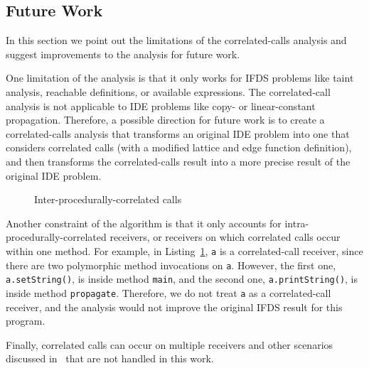 \begin{odelete}
\subsection{Future Work}
In this section we point out the limitations of the correlated-calls analysis and suggest improvements to the analysis for future work. 

One limitation of the analysis is that it only works for IFDS problems like taint analysis, reachable definitions, or available expressions. The correlated-call analysis is not applicable to IDE problems like copy- or linear-constant propagation. Therefore, a possible direction for future work is to create a correlated-calls analysis that transforms an original IDE problem into one that considers correlated calls (with a modified lattice and edge function definition), and then transforms the correlated-calls result into a more precise result of the original IDE problem.

\begin{figure}
  \centering
  \begin{minipage}{\textwidth}
  \end{minipage}
  \caption{Inter-procedurally-correlated calls}
  \label{list:interProcRec}
\end{figure}

Another constraint of the algorithm is that it only accounts for intra-procedurally-correlated receivers, or receivers on which correlated calls occur within one method. For example, in Listing~\ref{list:interProcRec}, \verb'a' is a correlated-call receiver, since there are two polymorphic method invocations on \verb'a'. However, the first one, \verb'a.setString()', is inside method \verb'main', and the second one, \verb'a.printString()', is inside method \verb'propagate'. Therefore, we do not treat \verb'a' as a correlated-call receiver, and the analysis would not improve the original IFDS result for this program.

Finally, correlated calls can occur on multiple receivers and other scenarios discussed in~\cite{DBLP:journals/scp/Tip15} that are not handled in this work.

\end{odelete}
